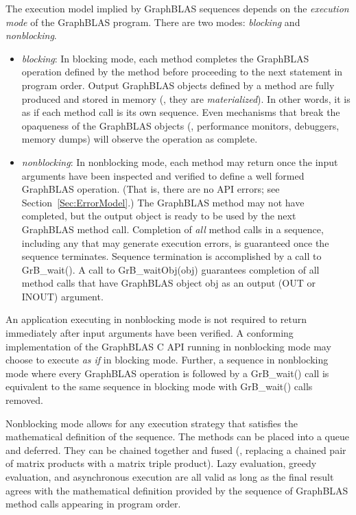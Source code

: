 The execution model
implied by GraphBLAS sequences depends on the \emph{execution mode} of the 
GraphBLAS program.  There are two modes: \emph{blocking} and \emph{nonblocking}.  
\begin{itemize}

\item \emph{blocking}: In blocking mode, each method completes the
GraphBLAS operation defined by the method before proceeding to the
next statement in program order.  Output GraphBLAS objects defined by a
method are fully produced and stored in  memory (\ie, they are
\emph{materialized}).  In other words, it is as if each method call is its own sequence.
Even mechanisms that break the opaqueness of the
GraphBLAS objects (\eg, performance monitors, debuggers, memory dumps)
will observe the operation as complete.

\item \emph{nonblocking}: In nonblocking mode, each method may return
once the input arguments have been inspected and verified to define
a well formed GraphBLAS operation. (That is, there are no API errors;
see Section~\ref{Sec:ErrorModel}.) The GraphBLAS method may not have
completed, but the output object is ready to be used by the next GraphBLAS
method call.  Completion of \emph{all} method calls in a sequence,
including any that may generate execution errors, is guaranteed once the
sequence terminates.  Sequence termination is accomplished by a call
to  {\sf GrB\_wait()}.  A call to {\sf GrB\_waitObj(obj)} guarantees
completion of all method calls that have GraphBLAS object {\sf obj}
as an output ({\sf OUT} or {\sf INOUT}) argument.

\end{itemize}

An application executing in nonblocking mode is not required to return
immediately after input arguments have been verified. A conforming
implementation of the GraphBLAS C API running in nonblocking mode may
choose to execute {\it as if} in blocking mode.  Further, a sequence in
nonblocking mode where every GraphBLAS operation is followed by a {\sf
GrB\_wait()} call is equivalent to the same sequence in blocking mode
with {\sf GrB\_wait()} calls removed.

Nonblocking mode allows for any execution strategy that satisfies the
mathematical definition of the sequence.  The methods can be placed
into a queue and deferred.  They can be chained together and fused
(\eg, replacing a chained pair of matrix products with a matrix triple
product).  Lazy evaluation, greedy evaluation, and asynchronous execution
are all valid as long as the final result agrees with the mathematical
definition provided by the sequence of GraphBLAS method calls appearing
in  program order.

